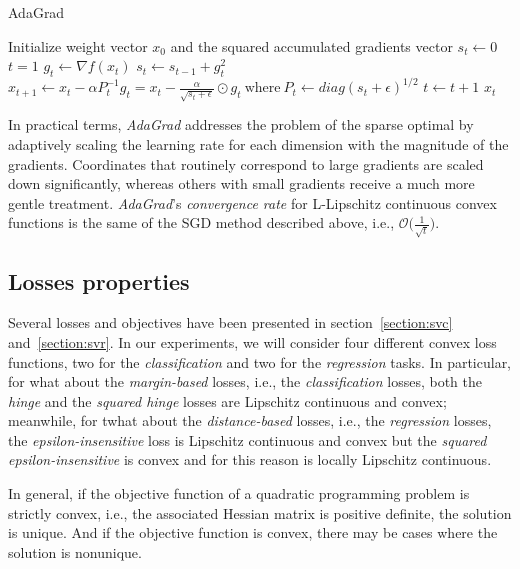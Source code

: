 \begin{algorithm}[H]
	\caption{AdaGrad}
	\label{alg:adagrad}
	\begin{algorithmic}
			\State Initialize weight vector $x_0$ and the squared accumulated gradients vector $s_t \gets 0$
			\State $t = 1$
				\State $g_t \gets \nabla f(x_t)$
				\State $s_t \gets s_{t-1} + g_t^2$
				\State $x_{t+1} \gets x_t - \alpha P_t^{-1} g_t = x_t - \displaystyle \frac{\alpha}{\sqrt{s_t + \epsilon}} \odot g_t \ \text{where} \ P_t \gets diag(s_t + \epsilon)^{1/2}$
				\State $t \gets t + 1$
			\EndWhile
			\State \Return $x_t$
		\EndFunction
	\end{algorithmic}
\end{algorithm}

In practical terms, \emph{AdaGrad} addresses the problem of the sparse optimal by adaptively scaling the learning rate for each dimension with the magnitude of the gradients. Coordinates that routinely correspond to large gradients are scaled down significantly, whereas others with small gradients receive a much more gentle treatment. \emph{AdaGrad}'s \emph{convergence rate} for L-Lipschitz continuous convex functions is the same of the SGD method described above, i.e., $\displaystyle \mathcal{O}\Bigg(\frac{1}{\sqrt{t}}\Bigg)$.


\subsection{Losses properties}

Several losses and objectives have been presented in section~\ref{section:svc} and~\ref{section:svr}. In our experiments, we will consider four different convex loss functions, two for the \emph{classification} and two for the \emph{regression} tasks. In particular, for what about the \emph{margin-based} losses, i.e., the \emph{classification} losses, both the \emph{hinge} and the \emph{squared hinge} losses are Lipschitz continuous and convex; meanwhile, for twhat about the \emph{distance-based} losses, i.e., the \emph{regression} losses, the \emph{epsilon-insensitive} loss is Lipschitz continuous and convex but the \emph{squared epsilon-insensitive} is convex and for this reason is locally Lipschitz continuous.

In general, if the objective function of a quadratic programming problem is strictly convex, i.e., the associated Hessian matrix is positive definite, the solution is unique. And if the objective function is convex, there may be cases where the solution is nonunique.

